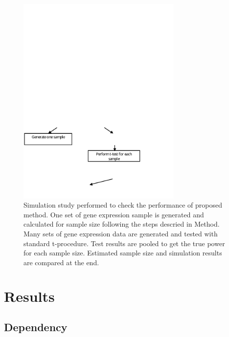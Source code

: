 \documentclass{bioinfo}
\begin{document}
\begin{figure}[h]
  \centerline{\includegraphics*[width=3.2in]{SimuFC.pdf}}
  \caption[Flow Chart for Simulation Study]{
    Simulation study performed to check the performance of proposed method.
    One set of gene expression sample is generated and calculated
    for sample size following the steps descried in Method. Many
    sets of gene expression data are generated and tested with
    standard t-procedure. Test results are pooled to get the true
    power for each sample size. Estimated sample size and simulation
    results are compared at the end.}
  \label{fig:SimuFC}
\end{figure}

\section{Results}

\subsection{Dependency}
\end{document}
